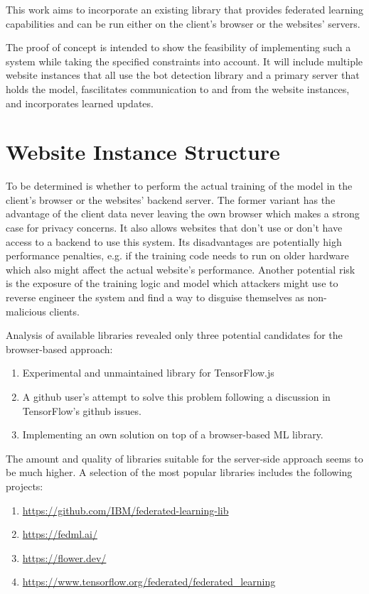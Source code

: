 \documentclass[
    fontsize=12pt,
    headings=small,
    parskip=half,           %
    bibliography=totoc,
    numbers=noenddot,       %
    open=any,               %
    ]{scrreprt}
\begin{document}
This work aims to incorporate an existing library that provides federated learning capabilities and can be run either on the client's browser or the websites' servers.

The proof of concept is intended to show the feasibility of implementing such a system while taking the specified constraints into account. It will include multiple website instances that all use the bot detection library and a primary server that holds the model, fascilitates communication to and from the website instances, and incorporates learned updates.

\section{Website Instance Structure}

To be determined is whether to perform the actual training of the model in the client's browser or the websites' backend server. The former variant has the advantage of the client data never leaving the own browser which makes a strong case for privacy concerns. It also allows websites that don't use or don't have access to a backend to use this system. Its disadvantages are potentially high performance penalties, e.g. if the training code needs to run on older hardware which also might affect the actual website's performance. Another potential risk is the exposure of the training logic and model which attackers might use to reverse engineer the system and find a way to disguise themselves as non-malicious clients.

Analysis of available libraries revealed only three potential candidates for the browser-based approach:

\begin{enumerate}
	\item Experimental and unmaintained library for TensorFlow.js \cite{PAIRFL2019}
	\item A github user's attempt \cite{SaFL2019} to solve this problem following a discussion in TensorFlow's github issues.
	\item Implementing an own solution on top of a browser-based ML library.
\end{enumerate}

The amount and quality of libraries suitable for the server-side approach seems to be much higher. A selection of the most popular libraries includes the following projects:

\begin{enumerate}
	\item \url{https://github.com/IBM/federated-learning-lib}
	\item \url{https://fedml.ai/}
	\item \url{https://flower.dev/}
	\item \url{https://www.tensorflow.org/federated/federated_learning}
\end{enumerate}
\end{document}
